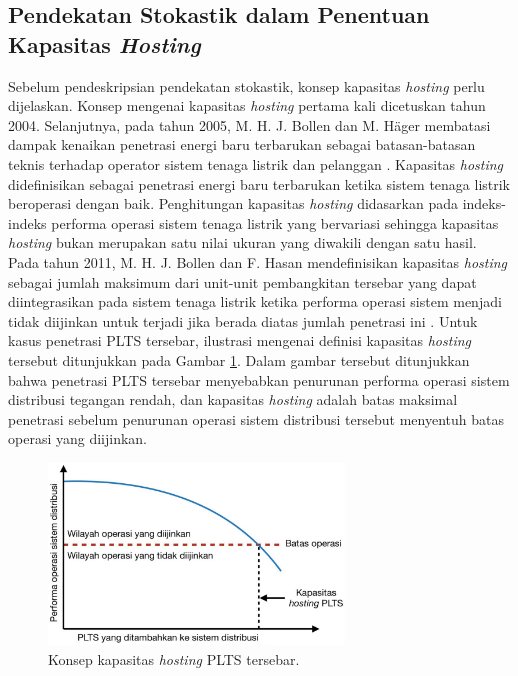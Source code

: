 {{\subsection{Pendekatan Stokastik dalam Penentuan Kapasitas \textit{Hosting}}
Sebelum pendeskripsian pendekatan stokastik, konsep kapasitas \textit{hosting} perlu dijelaskan. Konsep mengenai kapasitas \textit{hosting} pertama kali dicetuskan tahun 2004. Selanjutnya, pada tahun 2005, M. H. J. Bollen dan M. H\"{a}ger membatasi dampak kenaikan penetrasi energi baru terbarukan sebagai batasan-batasan teknis terhadap operator sistem tenaga listrik dan pelanggan \cite{Bollen2005}. Kapasitas \textit{hosting} didefinisikan sebagai penetrasi energi baru terbarukan ketika sistem tenaga listrik beroperasi dengan baik. Penghitungan kapasitas \textit{hosting} didasarkan pada indeks-indeks performa operasi sistem tenaga listrik yang bervariasi sehingga kapasitas \textit{hosting} bukan merupakan satu nilai ukuran yang diwakili dengan satu hasil. Pada tahun 2011, M. H. J. Bollen dan F. Hasan mendefinisikan kapasitas \textit{hosting} sebagai jumlah maksimum dari unit-unit pembangkitan tersebar yang dapat diintegrasikan pada sistem tenaga listrik ketika performa operasi sistem menjadi tidak diijinkan untuk terjadi jika berada diatas jumlah penetrasi ini \cite{Bollen2011}. Untuk kasus penetrasi PLTS tersebar, ilustrasi mengenai definisi kapasitas \textit{hosting} tersebut ditunjukkan pada Gambar \ref{LimitPHC}. Dalam gambar tersebut ditunjukkan bahwa penetrasi PLTS tersebar menyebabkan penurunan performa operasi sistem distribusi tegangan rendah, dan kapasitas \textit{hosting} adalah batas maksimal penetrasi sebelum penurunan operasi sistem distribusi tersebut menyentuh batas operasi yang diijinkan.
\begin{figure}[!h]
	\vspace*{0pt}
	\centering
	\includegraphics[width=0.7\textwidth]{Fig/LimitPHC}
	\caption{Konsep kapasitas \textit{hosting} PLTS tersebar.}
	\label{LimitPHC}
\end{figure}

}}
